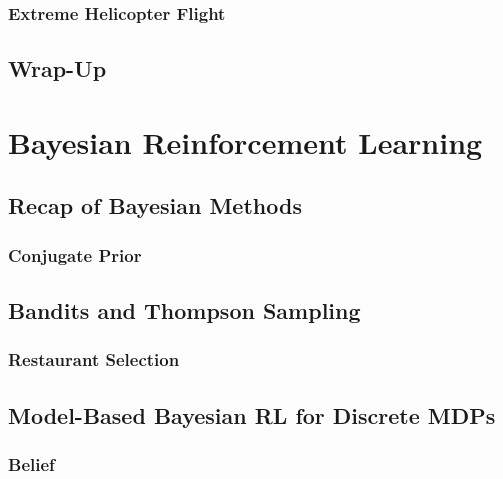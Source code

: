 		\subsection{Extreme Helicopter Flight} %

	\section{Wrap-Up} %

\chapter{Bayesian Reinforcement Learning} %

	\section{Recap of Bayesian Methods} %

		\subsection{Conjugate Prior} %

	\section{Bandits and Thompson Sampling} %

		\subsection{Restaurant Selection} %

	\section{Model-Based Bayesian RL for Discrete MDPs} %

		\subsection{Belief} %

